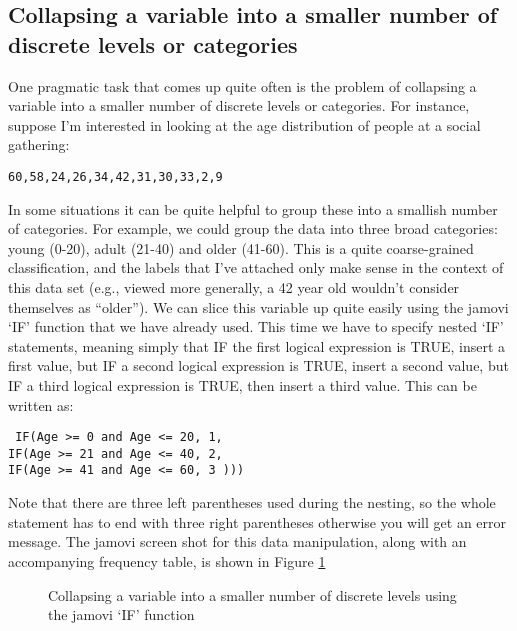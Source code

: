 \subsection{Collapsing a variable into a smaller number of discrete levels or categories}

One pragmatic task that comes up quite often is the problem of collapsing a variable into a smaller number of discrete levels or categories. For instance, suppose I'm interested in looking at the age distribution of people at a social gathering:
\begin{verbatim}
60,58,24,26,34,42,31,30,33,2,9
\end{verbatim}
In some situations it can be quite helpful to group these into a smallish number of categories. For example, we could group the data into three broad categories: young (0-20), adult (21-40) and older (41-60). This is a quite coarse-grained classification, and the labels that I've attached only make sense in the context of this data set (e.g., viewed more generally, a 42 year old wouldn't consider themselves as ``older''). We can slice this variable up quite easily using the jamovi `IF' function that we have already used. This time we have to specify nested `IF' statements, meaning simply that IF the first logical expression is TRUE, insert a first value, but IF a second logical expression is TRUE, insert a second value, but IF a third logical expression is TRUE, then insert a third value. This can be written as: 

\noindent
\texttt{
IF(Age >= 0 and Age <= 20, 1, \\
IF(Age >= 21 and Age <= 40, 2, \\
IF(Age >= 41 and Age <= 60, 3 )))
} 

Note that there are three left parentheses used during the nesting, so the whole statement has to end with three right parentheses otherwise you will get an error message. The jamovi screen shot for this data manipulation, along with an accompanying frequency table, is shown in Figure \ref{fig:agecats} 

\begin{figure}[!!htb]
\begin{center}
\caption{Collapsing a variable into a smaller number of discrete levels using the jamovi `IF' function}
\label{fig:agecats}
\end{center}
\end{figure}

